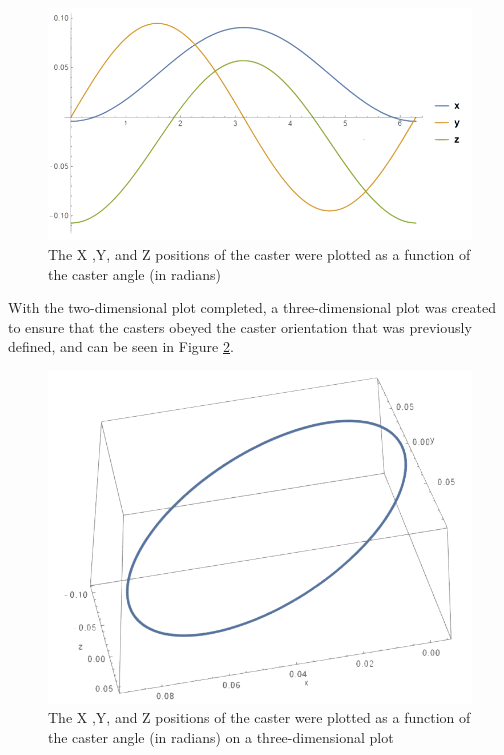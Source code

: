 \begin{figure}[!htb]
	\centering
	\includegraphics[width=\linewidth]{CasterWheel2DTest.png}
	\caption{The X ,Y, and Z positions of the caster were plotted as a function of the caster angle (in radians)}\label{fig:CasterWheel2DTest}
	\endminipage
\end{figure} 

With the two-dimensional plot completed, a three-dimensional plot was created to ensure that the casters obeyed the caster orientation that was previously defined, and can be seen in Figure \ref{fig:CasterWheel3DTest}.

\begin{figure}[!htb]
	\centering
	\includegraphics[width=\linewidth]{CasterWheel3DTest.png}
	\caption{The X ,Y, and Z positions of the caster were plotted as a function of the caster angle (in radians) on a three-dimensional plot}\label{fig:CasterWheel3DTest}
	\endminipage
\end{figure} 

